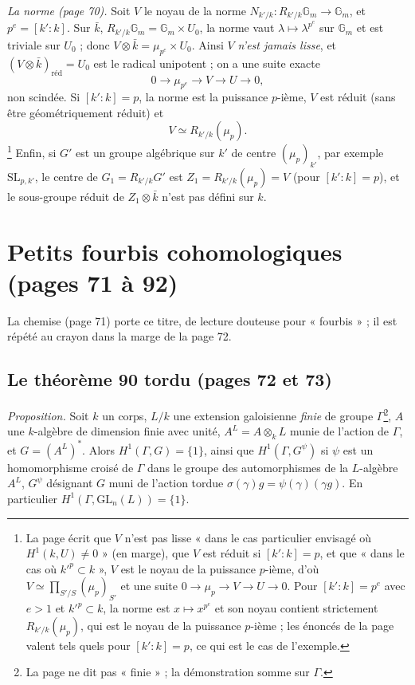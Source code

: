 \documentclass[11pt,a4paper]{article}
\begin{document}
\emph{La norme (page 70).} Soit $V$ le noyau de la norme $N_{k'/k} :
R_{k'/k}\mathbb{G}_m \to \mathbb{G}_m$, et $p^{e} = [k':k]$. Sur $\bar{k}$,
$R_{k'/k}\mathbb{G}_m = \mathbb{G}_m \times U_0$, la norme vaut $\lambda \mapsto
\lambda^{p^{e}}$ sur $\mathbb{G}_m$ et est triviale sur $U_0$ ; donc $V \otimes
\bar{k} = \mu_{p^{e}} \times U_0$. Ainsi $V$ \emph{n'est jamais lisse}, et
$(V \otimes \bar{k})_{\mathrm{réd}} = U_0$ est le radical unipotent ; on a une
suite exacte
\[
0 \to \mu_{p^{e}} \to V \to U \to 0,
\]
non scindée. Si $[k':k] = p$, la norme est la puissance $p$-ième, $V$ est
réduit (sans être géométriquement réduit) et
\[
V \simeq R_{k'/k}(\mu_p).
\]
\footnote{La page écrit que $V$ n'est pas lisse « dans le cas particulier
envisagé où $H^1(k, U) \neq 0$ » (en marge), que $V$ est réduit si $[k':k] =
p$, et que « dans le cas où $k'^{p} \subset k$ », $V$ est le noyau de la
puissance $p$-ième, d'où $V \simeq \prod_{S'/S}(\mu_p)_{S'}$ et une suite $0 \to
\mu_p \to V \to U \to 0$. Pour $[k':k] = p^{e}$ avec $e > 1$ et $k'^{p} \subset
k$, la norme est $x \mapsto x^{p^{e}}$ et son noyau contient strictement
$R_{k'/k}(\mu_p)$, qui est le noyau de la puissance $p$-ième ; les énoncés de
la page valent tels quels pour $[k':k] = p$, ce qui est le cas de l'exemple.}
Enfin, si $G'$ est un groupe algébrique sur $k'$ de centre $(\mu_p)_{k'}$, par
exemple $\mathrm{SL}_{p,k'}$, le centre de $G_1 = R_{k'/k}G'$ est $Z_1 =
R_{k'/k}(\mu_p) = V$ (pour $[k':k] = p$), et le sous-groupe réduit de $Z_1
\otimes \bar{k}$ n'est pas défini sur $k$.

\section*{Petits fourbis cohomologiques (pages 71 à 92)}

La chemise (page 71) porte ce titre, de lecture douteuse pour « fourbis » ;
il est répété au crayon dans la marge de la page 72.

\subsection*{Le théorème 90 tordu (pages 72 et 73)}

\emph{Proposition.} Soit $k$ un corps, $L/k$ une extension galoisienne
\emph{finie} de groupe $\Gamma$\footnote{La page ne dit pas « finie » ; la
démonstration somme sur $\Gamma$.}, $A$ une $k$-algèbre de dimension finie
avec unité, $A^{L} = A \otimes_k L$ munie de l'action de $\Gamma$, et $G =
(A^{L})^{*}$. Alors $H^1(\Gamma, G) = \lbrace 1\rbrace$, ainsi que $H^1(\Gamma,
G^{\psi})$ si $\psi$ est un homomorphisme croisé de $\Gamma$ dans le groupe des
automorphismes de la $L$-algèbre $A^{L}$, $G^{\psi}$ désignant $G$ muni de
l'action tordue $\sigma(\gamma)g = \psi(\gamma)(\gamma g)$. En particulier
$H^1(\Gamma, \mathrm{GL}_n(L)) = \lbrace 1\rbrace$.
\end{document}
